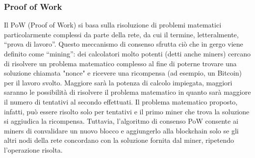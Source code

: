 \subsubsection{Proof of Work}
Il PoW (Proof of Work) si basa sulla risoluzione di problemi matematici particolarmente complessi da parte della rete, da cui il termine, letteralmente, “prova di lavoro”. Questo meccanismo di consenso sfrutta ciò che in gergo viene definito come “mining”: dei calcolatori molto potenti (detti anche miners) cercano di risolvere un problema matematico complesso al fine di poterne trovare una soluzione chiamata "nonce" e ricevere una ricompensa (ad esempio, un Bitcoin) per il lavoro svolto. Maggiore sarà la potenza di calcolo impiegata, maggiori saranno le possibilità di risolvere il problema matematico in quanto sarà maggiore il numero di tentativi al secondo effettuati. Il problema matematico proposto, infatti, può essere risolto solo per tentativi e il primo miner che trova la soluzione si aggiudica la ricompensa. Tuttavia, l’algoritmo di consenso PoW consente ai miners di convalidare un nuovo blocco e aggiungerlo alla blockchain solo se gli altri nodi della rete concordano con la soluzione fornita dal miner, ripetendo l’operazione risolta.

